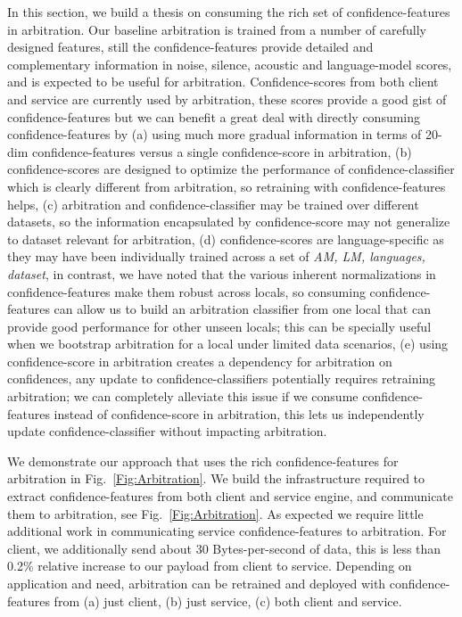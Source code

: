 In this section, we build a thesis on consuming the rich set of confidence-features in arbitration. 
Our baseline arbitration is trained from a number of carefully designed features, still the confidence-features provide detailed and complementary information in noise, silence, acoustic and language-model scores, and is expected to be useful for arbitration. Confidence-scores from both client and service are currently used by arbitration, these scores provide a good gist of confidence-features but we can benefit a great deal with directly consuming confidence-features by (a) using much more gradual information in terms of 20-dim confidence-features versus a single confidence-score in arbitration, (b) confidence-scores are designed to optimize the performance of confidence-classifier which is clearly different from arbitration, so retraining with confidence-features helps, (c) arbitration and confidence-classifier may be trained over different datasets, so the information encapsulated by confidence-score may not generalize to dataset relevant for arbitration, (d) confidence-scores are language-specific as they may have been individually trained across a set of \emph{AM, LM, languages, dataset}, in contrast, we have noted that the various inherent normalizations in confidence-features make them robust across locals, so consuming confidence-features can allow us to build an arbitration classifier from one local that can provide good performance for other unseen locals; this can be specially useful when we bootstrap arbitration for a local under limited data scenarios, (e) using confidence-score in arbitration creates a dependency for arbitration on confidences, any update to confidence-classifiers potentially requires retraining arbitration; we can completely alleviate this issue if we consume confidence-features instead of confidence-score in arbitration, this lets us independently update confidence-classifier without impacting arbitration.

We demonstrate our approach that uses the rich confidence-features for arbitration in Fig.~\ref{Fig:Arbitration}. We build the infrastructure required to extract confidence-features from both client and service engine, and communicate them to arbitration, see Fig.~\ref{Fig:Arbitration}. As expected we require little additional work in communicating service confidence-features to arbitration. For client, we additionally send about 30 Bytes-per-second of data, this is less than 0.2\% relative increase to our payload from client to service. Depending on application and need, arbitration can be retrained and deployed with confidence-features from (a) just client, (b) just service, (c) both client and service. 

